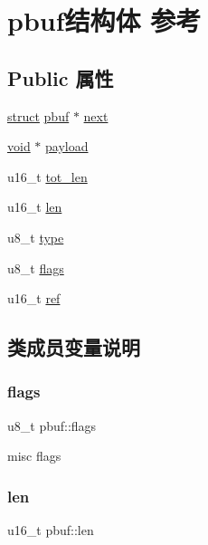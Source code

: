 \hypertarget{structpbuf}{}\section{pbuf结构体 参考}
\label{structpbuf}
\subsection*{Public 属性}
\begin{DoxyCompactItemize}
\item 
\hyperlink{interfacestruct}{struct} \hyperlink{structpbuf}{pbuf} $\ast$ \hyperlink{structpbuf_a5e5763c94fd18d78937b0b58ce7df341}{next}
\item 
\hyperlink{interfacevoid}{void} $\ast$ \hyperlink{structpbuf_a8d32dc3e964369d4eec638fc37fbc460}{payload}
\item 
u16\+\_\+t \hyperlink{structpbuf_a5259e7ec29bab9c0999b64f2e86b411f}{tot\+\_\+len}
\item 
u16\+\_\+t \hyperlink{structpbuf_a6f82449625e36e294f5d210268c0703f}{len}
\item 
u8\+\_\+t \hyperlink{structpbuf_afd7bff5210a022424caa97d2f25fe8e6}{type}
\item 
u8\+\_\+t \hyperlink{structpbuf_aa4d1af2cab3d9280d29212095b5b872a}{flags}
\item 
u16\+\_\+t \hyperlink{structpbuf_a18e2c02942feb1baa3756fcd585b6731}{ref}
\end{DoxyCompactItemize}


\subsection{类成员变量说明}
\mbox{\label{structpbuf_aa4d1af2cab3d9280d29212095b5b872a}} 
\subsubsection{\texorpdfstring{flags}{flags}}
{\footnotesize\ttfamily u8\+\_\+t pbuf\+::flags}

misc flags \mbox{\label{structpbuf_a6f82449625e36e294f5d210268c0703f}} 
\subsubsection{\texorpdfstring{len}{len}}
{\footnotesize\ttfamily u16\+\_\+t pbuf\+::len}

